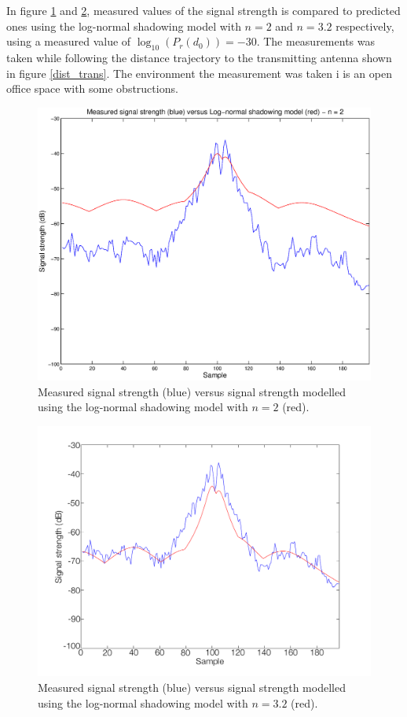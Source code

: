 \documentclass{LTHthesis}
\begin{document}
In figure \ref{log_norm_n_2} and \ref{log_norm_n_3_2}, measured values of the signal strength is compared to predicted ones using the log-normal shadowing model with $n=2$ and $n=3.2$ respectively, using a measured value of $\log_{10}({P_r(d_0)})= -30$. The measurements was taken while following the distance trajectory to the transmitting antenna shown in figure \ref{dist_trans}. The environment the measurement was taken i is an open office space with some obstructions.
%
\begin{figure}[!hbt]

\includegraphics[width=1\textwidth]{images/signal_model/log_norm_n_2.eps}
\caption{Measured signal strength (blue) versus signal strength modelled using the log-normal shadowing model with $n=2$ (red).}\label{log_norm_n_2}
\end{figure}
%
\begin{figure}[!hbt]

\includegraphics[width=1\textwidth ]{images/signal_model/log_norm_n_3_2}
\caption{Measured signal strength (blue) versus signal strength modelled using the log-normal shadowing model with $n=3.2$ (red).}\label{log_norm_n_3_2}
\end{figure}
\end{document}
